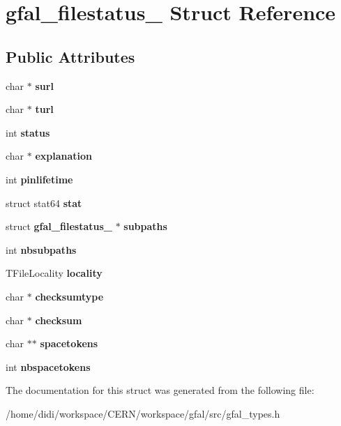 \section{gfal\_\-filestatus\_\- Struct Reference}
\label{structgfal__filestatus__}
\subsection*{Public Attributes}
\begin{DoxyCompactItemize}
\item 
char $\ast$ {\bfseries surl}\label{structgfal__filestatus___a2080b4be5efd52962cfe26d9f918ce4c}

\item 
char $\ast$ {\bfseries turl}\label{structgfal__filestatus___a88940e4a41064439da34af21955502a3}

\item 
int {\bfseries status}\label{structgfal__filestatus___aa991f1a6ffa1bd09ebd12e7a3e32dd31}

\item 
char $\ast$ {\bfseries explanation}\label{structgfal__filestatus___ae1e5dc1dcd33e5d8ee7839aa7d95d41b}

\item 
int {\bfseries pinlifetime}\label{structgfal__filestatus___a0a0e6c25c95b72f3b9b569080baf548a}

\item 
struct stat64 {\bfseries stat}\label{structgfal__filestatus___a6c31ab89815451215803dd98bcb1b678}

\item 
struct {\bf gfal\_\-filestatus\_\-} $\ast$ {\bfseries subpaths}\label{structgfal__filestatus___a4b31bd6933e3c196f70e02fa021b5aac}

\item 
int {\bfseries nbsubpaths}\label{structgfal__filestatus___a4543bddb223e8dde1a4466e5e14bb261}

\item 
TFileLocality {\bfseries locality}\label{structgfal__filestatus___a25e804844bd0bd5bef3abda356a4f414}

\item 
char $\ast$ {\bfseries checksumtype}\label{structgfal__filestatus___a7ff5255b4a99fa0e71d7f6e2695814ef}

\item 
char $\ast$ {\bfseries checksum}\label{structgfal__filestatus___a3243d6c9d855c33da659290957729ef2}

\item 
char $\ast$$\ast$ {\bfseries spacetokens}\label{structgfal__filestatus___a261cea6d1613f39f278bede6821d0ce2}

\item 
int {\bfseries nbspacetokens}\label{structgfal__filestatus___a626cfa03e8aebb35c5b5ffeb96e64da1}

\end{DoxyCompactItemize}


The documentation for this struct was generated from the following file:\begin{DoxyCompactItemize}
\item 
/home/didi/workspace/CERN/workspace/gfal/src/gfal\_\-types.h\end{DoxyCompactItemize}
